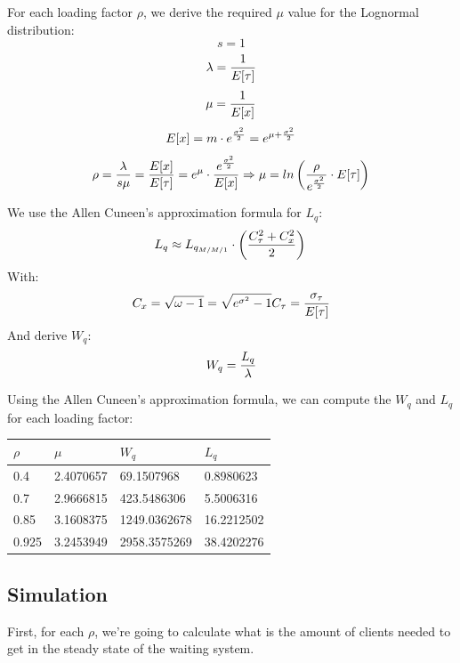 \documentclass[]{article}
\begin{document}
For each loading factor \(\rho\), we derive the required \(\mu\) value
for the Lognormal distribution: \[  s = 1 \]
\[  \lambda = { 1 \over E[\tau] } \] \[  \mu = {1 \over E[x]} \]
\[  E[x] = m \cdot e^{\sigma^{2} \over 2} = e^{\mu + {\sigma^{2} \over 2} }\]
\[  \rho = { \lambda \over {s\mu}} = { E[x] \over E[\tau] } = e^{\mu} \cdot { e^{\sigma^{2} \over 2} \over E[x] } \Rightarrow \mu = ln \left( { \rho \over e^{ \sigma^{2} \over 2 } } \cdot E[\tau]  \right) \]

We use the Allen Cuneen's approximation formula for \(L_{q}\): \[
  L_{q} \approx L_{q_{M/M/1}} \cdot \left( C_{\tau}^{2} + C_{x}^{2} \over 2  \right) \\
\] With: \[
C_{x} = \sqrt{ \omega - 1} =  \sqrt{ e^{\sigma^{2}} - 1} \\
C_{\tau} = { \sigma_{\tau} \over E[\tau] }
\] And derive \(W_{q}\): \[
  W_{q} = { L_{q} \over \lambda }
\]

Using the Allen Cuneen's approximation formula, we can compute the
\(W_{q}\) and \(L_{q}\) for each loading factor:

\begin{longtable}[]{@{}llll@{}}
\toprule
\(\rho\) & \(\mu\) & \(W_{q}\) & \(L_{q}\)\tabularnewline
\midrule
\endhead
0.4 & 2.4070657 & 69.1507968 & 0.8980623\tabularnewline
0.7 & 2.9666815 & 423.5486306 & 5.5006316\tabularnewline
0.85 & 3.1608375 & 1249.0362678 & 16.2212502\tabularnewline
0.925 & 3.2453949 & 2958.3575269 & 38.4202276\tabularnewline
\bottomrule
\end{longtable}

\subsection{Simulation}\label{simulation}

First, for each \(\rho\), we're going to calculate what is the amount of
clients needed to get in the steady state of the waiting system.
\end{document}
